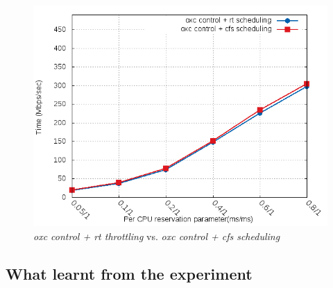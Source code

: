 \begin{figure}[htbp]
        \centering
        \includegraphics[width=\textwidth]{images/expB3}
        \caption{\emph{oxc control + rt throttling} vs. \emph{oxc control + cfs scheduling}}
        \label{fig:expB3}
\end{figure}
\subsection{What learnt from the experiment}
